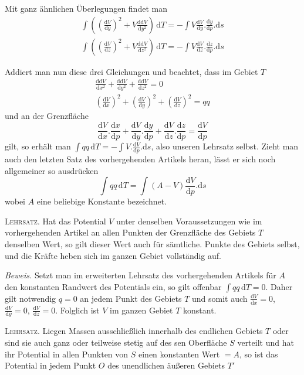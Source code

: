 Mit ganz ähnlichen Überlegungen findet man
\[
\begin{gathered}
\int((\frac{\mathrm dV}{\mathrm dy})^2+V\frac{\mathrm d\mathrm dV}{\mathrm dy^2})\,\mathrm dT=-\int V\frac{\mathrm dV}{\mathrm dy}.\frac{\mathrm dy}{\mathrm dp}.\mathrm ds\\
\int((\frac{\mathrm dV}{\mathrm dz})^2+V\frac{\mathrm d\mathrm dV}{\mathrm dz^2})\,\mathrm dT=-\int V\frac{\mathrm dV}{\mathrm dz}.\frac{\mathrm dz}{\mathrm dp}.\mathrm ds
\end{gathered}
\]

Addiert man nun diese drei Gleichungen und beachtet, dass im Gebiet $T$
\[
\begin{gathered}
\frac{\mathrm d\mathrm dV}{\mathrm dx^2}+\frac{\mathrm d\mathrm dV}{\mathrm dy^2}+\frac{\mathrm d\mathrm dV}{\mathrm dz^2}=0\\
(\frac{\mathrm dV}{\mathrm dx})^2+(\frac{\mathrm dV}{\mathrm dy})^2+(\frac{\mathrm dV}{\mathrm dz})^2=qq
\end{gathered}
\]
und an der Grenzfläche
\[
\frac{\mathrm dV}{\mathrm dx}.\frac{\mathrm dx}{\mathrm dp}+\frac{\mathrm dV}{\mathrm dy}.\frac{\mathrm dy}{\mathrm dp}+\frac{\mathrm dV}{\mathrm dz}.\frac{\mathrm dz}{\mathrm dp}=\frac{\mathrm dV}{\mathrm dp}
\]
gilt, so erhält man $\int qq\,\mathrm dT=-\int V.\frac{\mathrm dV}{\mathrm dp}.\mathrm ds$, also unseren Lehrsatz selbst. Zieht man auch den letzten Satz des vorhergehenden Artikels heran, lässt er sich noch allgemeiner so ausdrücken
\[
\int qq\,\mathrm dT=\int(A-V)\frac{\mathrm dV}{\mathrm dp}.\mathrm ds
\]
wobei $A$ eine beliebige Konstante bezeichnet.

\textsc{Lehrsatz.} Hat das Potential $V$ unter denselben Voraussetzungen wie im vorhergehenden Artikel an allen Punkten der Grenzfläche des Gebiets $T$ denselben Wert, so gilt dieser Wert auch für sämtliche. Punkte des Gebiets selbst, und die Kräfte heben sich im ganzen Gebiet vollständig auf.

\textit{Beweis.} Setzt man im erweiterten Lehrsatz des vorhergehenden Artikels für $A$ den konstanten Randwert des Potentials ein, so gilt offenbar $\int qq\,\mathrm dT=0$. Daher gilt notwendig $q=0$ an jedem Punkt des Gebiets $T$ und somit auch $\frac{\mathrm dV}{\mathrm dx}=0$, $\frac{\mathrm dV}{\mathrm dy}=0$, $\frac{\mathrm dV}{\mathrm dz}=0$. Folglich ist $V$ im ganzen Gebiet $T$ konstant.

\textsc{Lehrsatz.} Liegen Massen ausschließlich innerhalb des endlichen Gebiets $T$ oder sind sie auch ganz oder teilweise stetig auf des%
%
sen Oberfläche $S$ verteilt und hat ihr Potential in allen Punkten von $S$ einen konstanten Wert $=A$, so ist das Potential in jedem Punkt $O$ des unendlichen äußeren Gebiets $T'$

